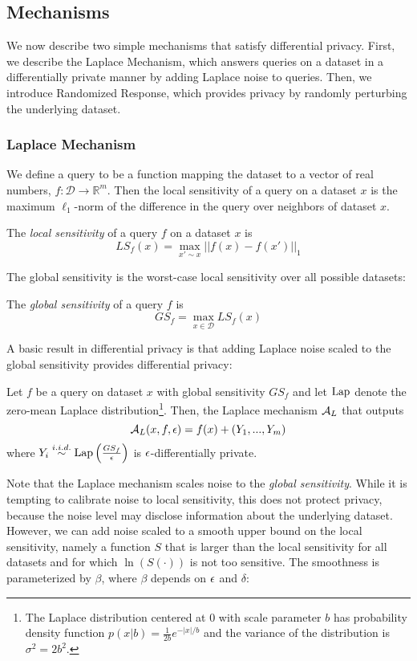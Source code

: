 \subsection*{Mechanisms}

We now describe two simple mechanisms that satisfy differential privacy. First, we describe the Laplace Mechanism, which answers queries on a dataset in a differentially private manner by adding Laplace noise to queries. Then, we introduce Randomized Response, which  provides privacy by randomly perturbing the underlying dataset.

\subsubsection{Laplace Mechanism}

 We define a query to be a function mapping the dataset to a vector of real numbers, $f: \mathcal{D} \to \mathbb{R}^m$. Then the local sensitivity of a query on a dataset $x$ is the maximum $\ell_1$-norm of the difference in the query over neighbors of dataset $x$.

\begin{definition}
The \emph{local sensitivity} of a query $f$ on a dataset $x$ is $$LS_f(x) = \max_{x' \sim x} ||f(x) - f(x')||_1$$
\end{definition}
The global sensitivity is the worst-case local sensitivity over all possible datasets:
\begin{definition}
The \emph{global sensitivity} of a query $f$ is $$GS_f = \max_{x \in \mathcal{D}} LS_f(x)$$
\end{definition}

A basic result in differential privacy is that adding Laplace noise scaled to the global sensitivity provides differential privacy:
\begin{theorem}
	\label{thm:laplace}
	Let $f$ be a query on dataset $x$ with global sensitivity $GS_f$ and let \emph{$\text{Lap}$} denote the zero-mean Laplace distribution\footnote{The Laplace distribution centered at $0$ with scale parameter $b$ has probability density function $p(x | b) = \frac{1}{2b} e^{-|x|/b}$ and the variance of the distribution is $\sigma^2 = 2b^2$.}. Then, the Laplace mechanism $\mathcal{A}_{L}$ that outputs 
	$$\mathcal{A}_L(x, f, \epsilon) = f(x) + (Y_1,...,Y_m)$$
	where $Y_i  \stackrel{i.i.d.}{\sim} \text{Lap}\left(\frac{GS_f}{\epsilon}\right)$ is $\epsilon$-differentially private.
\end{theorem}
Note that the Laplace mechanism scales noise to the \emph{global sensitivity}. While it is tempting to calibrate noise to local sensitivity, this does not protect privacy, because the noise level may disclose information about the underlying dataset. However, we can add noise scaled to a smooth upper bound on the local sensitivity, namely a function $S$ that is larger than the local sensitivity for all datasets and for which $\ln(S(\cdot))$ is not too sensitive. The smoothness is parameterized by $\beta$, where $\beta$ depends on $\epsilon$ and $\delta$:

